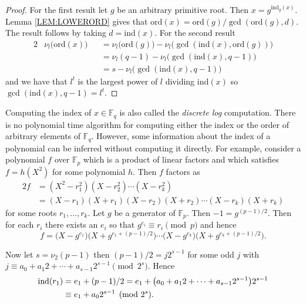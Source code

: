 \documentclass{article}
\let\originalleft\left
\let\originalright\right
\renewcommand{\left}{\mathopen{}\mathclose\bgroup\originalleft}
\renewcommand{\right}{\aftergroup\egroup\originalright}
\theoremstyle{plain}
\theoremstyle{definition}
\def\Fp {{ \mathbb{F} _ {p} }}
\def\Fq {{ \mathbb{F} _ {q} }}
\def\ind {{ \mathrm{ind} }}
\def\ord {{ \mathrm{ord} }}
\begin{document}
		\begin{proof}
		    For the first result let $g$ be an arbitrary primitive root. Then $x=g^{\ind_g(x)}$. Lemma \ref{LEM:LOWERORD} gives that $\ord(x)=\ord(g)/\gcd(\ord(g),d)$. The result follows by taking $d=\ind(x)$. For the second result 
				\begin{alignat*}{2}
				&\nu_l \bigl(\ord(x) \bigr) &&= \nu_l \bigl(\ord(g) \bigr) - \nu_l \bigl(\gcd(\ind(x),\ord(g)) \bigr)                                 \\
				&               &&= \nu_l(q-1) - \nu_l \bigl(\gcd(\ind(x),q-1) \bigr)                                    \\
				&               &&= s - \nu_l \bigl(\gcd(\ind(x),q-1) \bigr) 
				\end{alignat*}
				and we have that $l^t$ is the largest power of $l$ dividing $\ind(x)$ so $\gcd(\ind(x),q-1)=l^t$.
		\end{proof}
		
    Computing the index of $x \in \Fq$ is also called the \emph{discrete log} computation. There is no polynomial time algorithm for computing either the index or the order of arbitrary elements of $\Fq$. However, some information about the index of a polynomial can be inferred without computing it directly. For example, consider a polynomial $f$ over $\Fp$ which is a product of linear factors and which satisfies $f=h(X^2)$ for some polynomial $h$. Then $f$ factors as
		\begin{alignat*}{2}
		    f &=(X^2-r_1^2)(X-r_2^2) \cdots(X-r_k^2)                    \\
				  &=(X-r_1)(X+r_1)(X-r_2)(X+r_2)\cdots(X-r_k)(X+r_k) 
		\end{alignat*}
		\noindent for some roots $r_1,\ldots,r_k$. Let $g$ be a generator of $\Fp$. Then $-1 = g^{(p-1)/2}$. Then for each $r_i$ there exists an $e_i$ so that $g^{e_i} \equiv r_i \pmod p$ and hence 	
		\[ f=\bigl(X-g^{e_1} \bigr) \bigl(X+g^{e_1+(p-1)/2} \bigr) \cdots \bigl(X-g^{e_k} \bigr) \bigl(X+g^{e_k+(p-1)/2} \bigr) .\]
		
		Now let $s=\nu_2(p-1)$ then $(p-1)/2=j2^{s-1}$ for some odd $j$ with $j \equiv a_0 + {a_1}2 + \cdots + a_{s-1}2^{s-1} \pmod {2^s}$. Hence 
		\begin{alignat*}{2}
		\ind(r_1) &=e_1+(p-1)/2=e_1+ \left( a_0 + {a_1}2 + \cdots + a_{s-1}2^{s-1} \right) 2^{s-1} \\
		          &\equiv e_1+{a_0}2^{s-1} \pmod {2^s}. 
		\end{alignat*}
		
\end{document}
